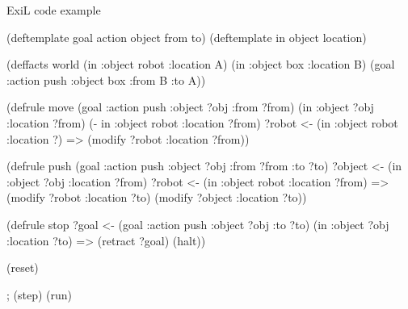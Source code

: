 \begin{listing}[H] %
\caption{ExiL code example}
\label{example}
\begin{clcode}
(deftemplate goal action object from to)
(deftemplate in object location)

(deffacts world
  (in :object robot :location A)
  (in :object box :location B)
  (goal :action push :object box :from B :to A))

(defrule move
  (goal :action push :object ?obj :from ?from)
  (in :object ?obj :location ?from)
  (- in :object robot :location ?from)
  ?robot <- (in :object robot :location ?)
  =>
  (modify ?robot :location ?from))

(defrule push
  (goal :action push :object ?obj :from ?from :to ?to)
  ?object <- (in :object ?obj :location ?from)
  ?robot <- (in :object robot :location ?from)
  =>
  (modify ?robot :location ?to)
  (modify ?object :location ?to))

(defrule stop
  ?goal <- (goal :action push :object ?obj :to ?to)
  (in :object ?obj :location ?to)
  =>
  (retract ?goal)
  (halt))

(reset)

; (step)
(run)
\end{clcode}
\end{listing}
